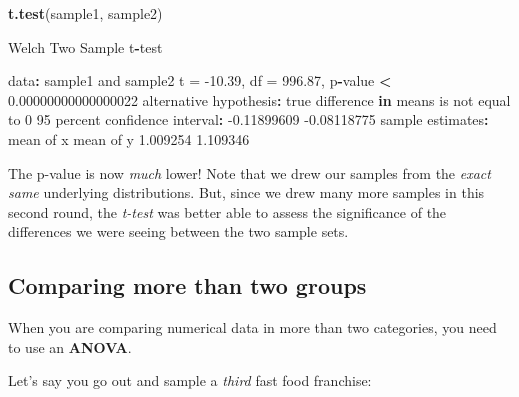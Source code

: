 \documentclass[]{book}
\newenvironment{Shaded}{\begin{snugshade}}{\end{snugshade}}
\newcommand{\ControlFlowTok}[1]{\textcolor[rgb]{0.13,0.29,0.53}{\textbf{#1}}}
\newcommand{\DecValTok}[1]{\textcolor[rgb]{0.00,0.00,0.81}{#1}}
\newcommand{\FloatTok}[1]{\textcolor[rgb]{0.00,0.00,0.81}{#1}}
\newcommand{\KeywordTok}[1]{\textcolor[rgb]{0.13,0.29,0.53}{\textbf{#1}}}
\newcommand{\NormalTok}[1]{#1}
\newcommand{\OperatorTok}[1]{\textcolor[rgb]{0.81,0.36,0.00}{\textbf{#1}}}
\newcommand{\StringTok}[1]{\textcolor[rgb]{0.31,0.60,0.02}{#1}}
\begin{document}
\begin{Shaded}
\begin{Highlighting}[]
\KeywordTok{t.test}\NormalTok{(sample1, }
\NormalTok{       sample2)}

\NormalTok{    Welch Two Sample t}\OperatorTok{-}\NormalTok{test}

\NormalTok{data}\OperatorTok{:}\StringTok{  }\NormalTok{sample1 and sample2}
\NormalTok{t =}\StringTok{ }\FloatTok{-10.39}\NormalTok{, df =}\StringTok{ }\FloatTok{996.87}\NormalTok{, p}\OperatorTok{-}\NormalTok{value }\OperatorTok{<}\StringTok{ }\FloatTok{0.00000000000000022}
\NormalTok{alternative hypothesis}\OperatorTok{:}\StringTok{ }\NormalTok{true difference }\ControlFlowTok{in}\NormalTok{ means is not equal to }\DecValTok{0}
\DecValTok{95}\NormalTok{ percent confidence interval}\OperatorTok{:}
\StringTok{ }\FloatTok{-0.11899609} \FloatTok{-0.08118775}
\NormalTok{sample estimates}\OperatorTok{:}
\NormalTok{mean of x mean of y }
 \FloatTok{1.009254}  \FloatTok{1.109346} 
\end{Highlighting}
\end{Shaded}

The p-value is now \emph{much} lower! Note that we drew our samples from the \emph{exact same} underlying distributions. But, since we drew many more samples in this second round, the \emph{t-test} was better able to assess the significance of the differences we were seeing between the two sample sets.

\hypertarget{comparing-more-than-two-groups}{%
\subsection*{Comparing more than two groups}\label{comparing-more-than-two-groups}}

When you are comparing numerical data in more than two categories, you need to use an \textbf{ANOVA}.

Let's say you go out and sample a \emph{third} fast food franchise:
\end{document}
